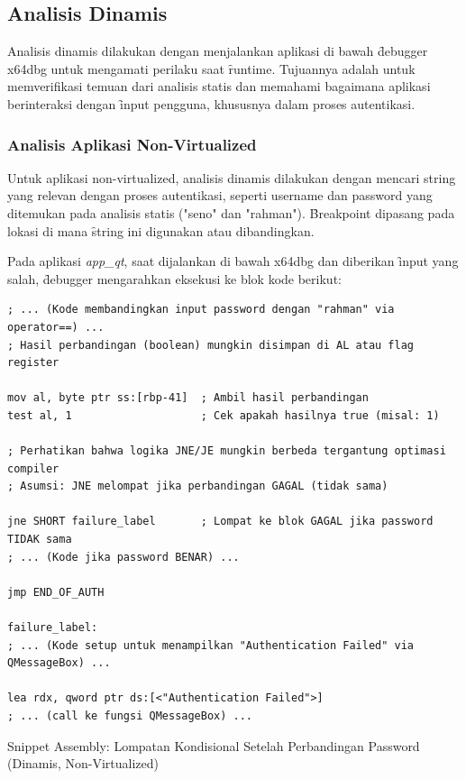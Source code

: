\subsection{Analisis Dinamis}
Analisis dinamis dilakukan dengan menjalankan aplikasi di bawah \f{debugger} x64dbg untuk mengamati perilaku saat \f{runtime}. Tujuannya adalah untuk memverifikasi temuan dari analisis statis dan memahami bagaimana aplikasi berinteraksi dengan \f{input} pengguna, khususnya dalam proses autentikasi.

\subsubsection{Analisis Aplikasi Non-Virtualized}

Untuk aplikasi non-virtualized, analisis dinamis dilakukan dengan mencari string yang relevan dengan proses autentikasi, seperti username dan password yang ditemukan pada analisis statis ("seno" dan "rahman"). \f{Breakpoint} dipasang pada lokasi di mana \f{string} ini digunakan atau dibandingkan.

Pada aplikasi \textit{app\_qt}, saat dijalankan di bawah x64dbg dan diberikan \f{input} yang salah, \f{debugger} mengarahkan eksekusi ke blok kode berikut:

\begin{listing}[H]
    \begin{verbatim}
; ... (Kode membandingkan input password dengan "rahman" via operator==) ...
; Hasil perbandingan (boolean) mungkin disimpan di AL atau flag register

mov al, byte ptr ss:[rbp-41]  ; Ambil hasil perbandingan
test al, 1                    ; Cek apakah hasilnya true (misal: 1)

; Perhatikan bahwa logika JNE/JE mungkin berbeda tergantung optimasi compiler
; Asumsi: JNE melompat jika perbandingan GAGAL (tidak sama)

jne SHORT failure_label       ; Lompat ke blok GAGAL jika password TIDAK sama
; ... (Kode jika password BENAR) ...

jmp END_OF_AUTH

failure_label:
; ... (Kode setup untuk menampilkan "Authentication Failed" via QMessageBox) ...

lea rdx, qword ptr ds:[<"Authentication Failed">]
; ... (call ke fungsi QMessageBox) ...

\end{verbatim}
\caption{Snippet Assembly: Lompatan Kondisional Setelah Perbandingan Password (Dinamis, Non-Virtualized)}
\label{lst:asm_dynamic_nonvirt_snippet}
\end{listing}

